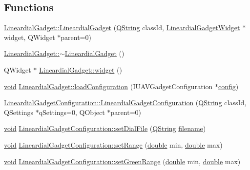 \subsection*{Functions}
\begin{DoxyCompactItemize}
\item 
\hyperlink{group___linear_dial_plugin_gae00c0aad0b87c017df5b0305d6fb1c5b}{Lineardial\-Gadget\-::\-Lineardial\-Gadget} (\hyperlink{group___u_a_v_objects_plugin_gab9d252f49c333c94a72f97ce3105a32d}{Q\-String} class\-Id, \hyperlink{class_lineardial_gadget_widget}{Lineardial\-Gadget\-Widget} $\ast$widget, Q\-Widget $\ast$parent=0)
\item 
\hyperlink{group___linear_dial_plugin_gaee31b5207ca412de6722401f392a8fd0}{Lineardial\-Gadget\-::$\sim$\-Lineardial\-Gadget} ()
\item 
Q\-Widget $\ast$ \hyperlink{group___linear_dial_plugin_ga65e61a0bf52e2ab9b2fe4ba7e3ae3b96}{Lineardial\-Gadget\-::widget} ()
\item 
\hyperlink{group___u_a_v_objects_plugin_ga444cf2ff3f0ecbe028adce838d373f5c}{void} \hyperlink{group___linear_dial_plugin_ga6bdccc9d4347fd8f04ea5e893877a30f}{Lineardial\-Gadget\-::load\-Configuration} (I\-U\-A\-V\-Gadget\-Configuration $\ast$\hyperlink{deflate_8c_a4473b5227787415097004fd39f55185e}{config})
\item 
\hyperlink{group___linear_dial_plugin_ga49b8e3de979573e8574a47a355fb537f}{Lineardial\-Gadget\-Configuration\-::\-Lineardial\-Gadget\-Configuration} (\hyperlink{group___u_a_v_objects_plugin_gab9d252f49c333c94a72f97ce3105a32d}{Q\-String} class\-Id, Q\-Settings $\ast$q\-Settings=0, Q\-Object $\ast$parent=0)
\item 
\hyperlink{group___u_a_v_objects_plugin_ga444cf2ff3f0ecbe028adce838d373f5c}{void} \hyperlink{group___linear_dial_plugin_ga20902ca5cb846c1c93ac9d0ef3799eca}{Lineardial\-Gadget\-Configuration\-::set\-Dial\-File} (\hyperlink{group___u_a_v_objects_plugin_gab9d252f49c333c94a72f97ce3105a32d}{Q\-String} \hyperlink{ioapi_8h_a7a03a664b090ce5c848ecb31cb4a2fa8}{filename})
\item 
\hyperlink{group___u_a_v_objects_plugin_ga444cf2ff3f0ecbe028adce838d373f5c}{void} \hyperlink{group___linear_dial_plugin_gaa4baee59ed6a862a9c31f64b2349acdc}{Lineardial\-Gadget\-Configuration\-::set\-Range} (\hyperlink{_super_l_u_support_8h_a8956b2b9f49bf918deed98379d159ca7}{double} min, \hyperlink{_super_l_u_support_8h_a8956b2b9f49bf918deed98379d159ca7}{double} max)
\item 
\hyperlink{group___u_a_v_objects_plugin_ga444cf2ff3f0ecbe028adce838d373f5c}{void} \hyperlink{group___linear_dial_plugin_ga126eafb9e37022d0160d544665e9687d}{Lineardial\-Gadget\-Configuration\-::set\-Green\-Range} (\hyperlink{_super_l_u_support_8h_a8956b2b9f49bf918deed98379d159ca7}{double} min, \hyperlink{_super_l_u_support_8h_a8956b2b9f49bf918deed98379d159ca7}{double} max)

\end{DoxyCompactItemize}
